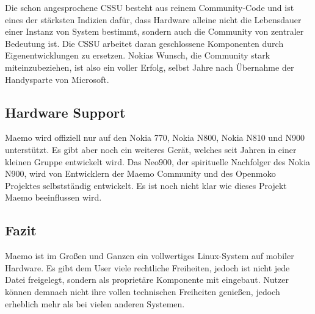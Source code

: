 Die schon angesprochene CSSU besteht aus reinem Community-Code und ist eines der stärksten Indizien dafür, dass Hardware alleine nicht die Lebensdauer einer Instanz von System bestimmt, sondern auch die Community von zentraler Bedeutung ist. Die CSSU arbeitet daran geschlossene Komponenten durch Eigenentwicklungen zu ersetzen. Nokias Wunsch, die Community stark miteinzubeziehen, ist also ein voller Erfolg, selbst Jahre nach Übernahme der Handysparte von Microsoft\thinspace\cite{online:nokia-microsoft}.
\newline

\subsection{Hardware Support}
Maemo wird offiziell nur auf den Nokia 770\thinspace\cite{online:maemo1-770}, Nokia N800\thinspace\cite{online:n800-specs}, Nokia N810\thinspace\cite{online:n810-specs} und N900\thinspace\cite{online:n900-specs} unterstützt. Es gibt aber noch ein weiteres Gerät, welches seit Jahren in einer kleinen Gruppe entwickelt wird. Das Neo900, der spirituelle Nachfolger des Nokia N900\thinspace\cite{online:maemo-neo900}, wird von Entwicklern der Maemo Community und des Openmoko Projektes selbstständig entwickelt\thinspace\cite{online:maemo-neo900team}. Es ist noch nicht klar wie dieses Projekt Maemo beeinflussen wird.
\newline

\subsection{Fazit}
Maemo ist im Großen und Ganzen ein vollwertiges Linux-System auf mobiler Hardware. Es gibt dem User viele rechtliche Freiheiten, jedoch ist nicht jede Datei freigelegt, sondern als proprietäre Komponente mit eingebaut. Nutzer können demnach nicht ihre vollen technischen Freiheiten genießen, jedoch erheblich mehr als bei vielen anderen Systemen.